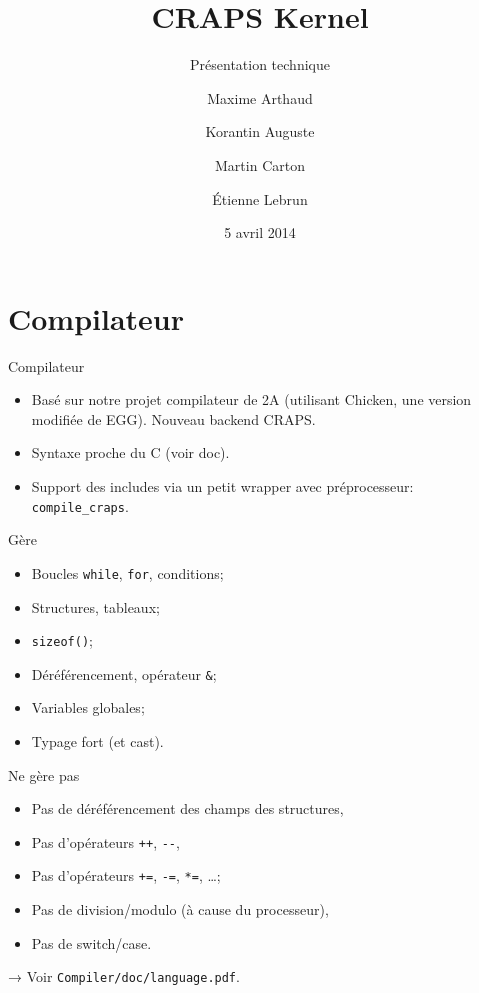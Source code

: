 \documentclass{beamer}
\title{CRAPS Kernel}
\subtitle{Présentation technique}
\author{
       Maxime Arthaud
  \and Korantin Auguste
  \and Martin Carton
  \and Étienne Lebrun
}
\date{5 avril 2014}
\begin{document}
  \begin{frame}
    \titlepage%
  \end{frame}

  \section{Compilateur}
    \begin{frame}[fragile]{Compilateur}
      \begin{itemize}
        \item Basé sur notre projet compilateur de 2A (utilisant Chicken, une
          version modifiée de EGG). Nouveau backend CRAPS.
        \item Syntaxe proche du C (voir doc).
        \item Support des includes via un petit wrapper avec préprocesseur:
          \verb+compile_craps+.
      \end{itemize}
\end{frame}

    \begin{frame}[fragile]{Gère}
      \begin{itemize}
        \item Boucles \verb+while+, \verb+for+, conditions;
        \item Structures, tableaux;
        \item \verb+sizeof()+;
        \item Déréférencement, opérateur \verb+&+;
        \item Variables globales;
        \item Typage fort (et cast).
      \end{itemize}
\end{frame}

    \begin{frame}[fragile]{Ne gère pas}
      \begin{itemize}
        \item Pas de déréférencement des champs des structures,
        \item Pas d'opérateurs \verb|++|, \verb|--|,
        \item Pas d'opérateurs \verb|+=|, \verb|-=|, \verb|*=|, \dots;
        \item Pas de division/modulo (à cause du processeur),
        \item Pas de switch/case.
      \end{itemize}

      \pause
      → Voir \verb+Compiler/doc/language.pdf+.
\end{frame}
\end{document}
